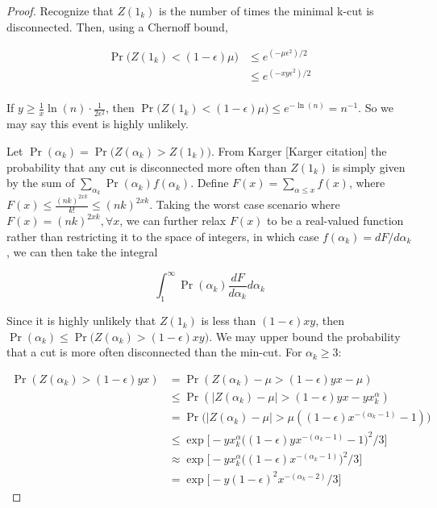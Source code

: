 \documentclass[12pt]{article}
\begin{document}
\begin{proof}
Recognize that $Z(1_k)$ is the number of times the minimal k-cut is disconnected. Then, using a Chernoff bound, 

\begin{align*}
\Pr \bigg(Z(1_k) < (1-\epsilon) \mu \bigg) &\leq e^{(-\mu \epsilon^2)/2} \\
&\leq e^{(-xy \epsilon^2)/2} \\
\end{align*}

If $y \geq \frac{1}{x} \ln(n) \cdot \frac{1}{2\epsilon^2}$, then $\Pr \bigg(Z(1_k) < (1-\epsilon)\mu \bigg) \leq e^{-\ln(n)} = n^{-1}$. So we may say this event is highly unlikely. 

Let $\Pr(\alpha_k) = \Pr \bigg( Z(\alpha_k) > Z(1_k) \bigg)$. From Karger [Karger citation] the probability that any cut is disconnected more often than $Z(1_k)$ is simply given by the sum of $\sum_{\alpha_k} \Pr(\alpha_k) f(\alpha_k)$. Define $F(x) = \sum_{\alpha \leq x} f(x)$, where $F(x) \leq \frac{(nk)^{2 xk}}{k!} \leq (nk)^{2xk}$. Taking the worst case scenario where $F(x) = (nk)^{2xk}, \forall x$, we can further relax $F(x)$ to be a real-valued function rather than restricting it to the space of integers, in which case $f(\alpha_k) = dF/d \alpha_k$, we can then take the integral

\[
\int_{1}^\infty \Pr(\alpha_k) \frac{dF}{d\alpha_k} d\alpha_k
\]

Since it is highly unlikely that $Z(1_k)$ is less than $(1-\epsilon)xy$, then $\Pr(\alpha_k) \leq \Pr \bigg(Z(\alpha_k) > (1-\epsilon)xy \bigg)$. We may upper bound the probability that a cut is more often disconnected than the min-cut. For $\alpha_k \geq 3$:

\begin{align*}
\Pr(Z(\alpha_k) > (1 - \epsilon)yx) &= \Pr(Z(\alpha_k) - \mu > (1 - \epsilon)yx - \mu) \\
&\leq \Pr(|Z(\alpha_k)-\mu| > (1-\epsilon)yx - yx^\alpha_k) \\
&= \Pr \bigg(|Z(\alpha_k)-\mu| > \mu ((1-\epsilon) x^{-(\alpha_k-1)}-1)\bigg) \\
&\leq \exp \bigg[-yx^\alpha_k \bigg((1-\epsilon)yx^{-(\alpha_k-1)}-1\bigg)^2/3\bigg] \\
&\approx \exp \bigg[-yx^\alpha_k \bigg((1-\epsilon)x^{-(\alpha_k - 1)}\bigg)^2/3\bigg] \\
&= \exp \bigg[-y (1-\epsilon)^2 x^{-(\alpha_k-2)}/3\bigg]
\end{align*}


\end{proof}
\end{document}
